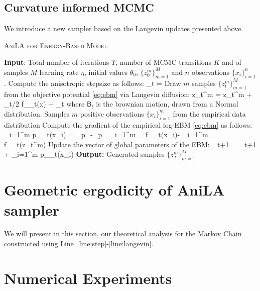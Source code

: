 \documentclass{article}
\begin{document}
\subsection{Curvature informed MCMC}

We introduce a new sampler based on the Langevin updates presented above.

\begin{algorithm}[H]
\caption{\textsc{AniLA for Energy-Based Model}} \label{alg:ldams}
\begin{algorithmic}[1]
\STATE \textbf{Input}: Total number of iterations $T$, number of MCMC transitions $K$ and of samples $M$ learning rate $\eta$, initial values $\theta_0$, $\{ z_{0}^m \}_{m=1}^M$ and $n$ observations $\{ x_{i} \}_{i=1}^n$.
\STATE Compute the anisotropic stepsize as follows: \label{line:step}
\beq
\stepsize_t = 
\eeq
\STATE Draw $m$ samples $\{ z_{t}^m \}_{m=1}^M$ from the objective potential \eqref{eq:ebm} via Langevin diffusion:\label{line:langevin}
\beq
z_{t}^m = z_{t}^m + \stepsize_t/2  \nabla f_{\theta_t}(x) + \sqrt{\stepsize} _t
\eeq
where $\mathsf{B}_t$ is the brownian motion, drawn from a Normal distribution.
\STATE Samples $m$ positive observations $\{ x_{i} \}_{i=1}^m$ from the empirical data distribution
\STATE Compute the gradient of the empirical log-EBM \eqref{eq:ebm} as follows:
\beq
\nabla \sum_{i=1}^m \log p_{\theta_t}(x_i) = _{p_{}}-_{p_{\theta}} \approx {} \sum_{i=1}^{m} \nabla_{\theta} f_{\theta_t}\left(x_{i}\right)- \sum_{i=1}^{m} \nabla_{\theta} f_{\theta_t}\left(z_t^m\right)
\eeq
\STATE Update the vector of global parameters of the EBM:
\beq
\theta_{t+1} = \theta_{t+1} + \eta \nabla \sum_{i=1}^m \log p_{\theta_t}(x_i)
\eeq
\ENDFOR
\STATE \textbf{Output:} Generated samples $\{ z_{T}^m \}_{m=1}^M$
\end{algorithmic}
\end{algorithm}



\section{Geometric ergodicity of AniLA sampler}
We will present in this section, our theoretical analysis for the Markov Chain constructed using Line~\ref{line:step}-\ref{line:langevin}. 


\section{Numerical Experiments}
\end{document}
